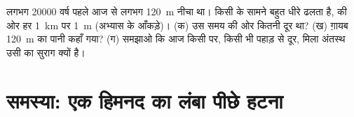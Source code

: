 \begin{exercise}[$\star\star\star$]\label{exo:g8:ice-on-earth:12}
लगभग \num{20000} वर्ष पहले  आज से लगभग \qty{120}{m} नीचा था। किसी  के सामने
 बहुत धीरे ढलता है,  की ओर हर \qty{1}{km} पर \qty{1}{m}
(अभ्यास के आँकड़े)। (क) उस समय   की ओर कितनी दूर था? (ख) ग़ायब
\qty{120}{m} का पानी कहाँ गया? (ग) समझाओ कि आज किसी  पर, किसी भी पहाड़ से दूर,
मिला अंतस्थ  उसी  का सुराग क्यों
है।
\end{exercise}

\section{समस्या: एक हिमनद का लंबा पीछे हटना}

